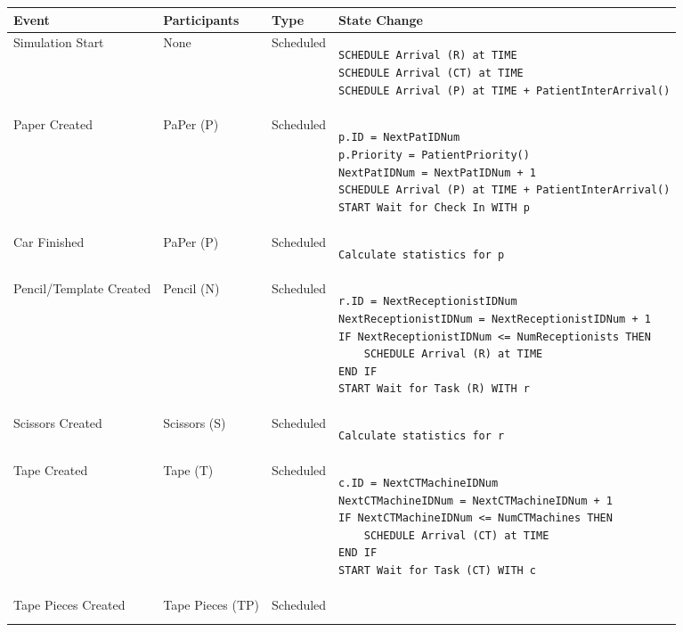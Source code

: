 \begin{longtable}{@{}>{\raggedright\arraybackslash}p{1.5cm}>{\raggedright\arraybackslash}p{2.1cm}>{\raggedright\arraybackslash}p{2.2cm}>{\raggedright\arraybackslash}p{10cm}@{}}
  \toprule
  Event          & Participants & Type       & State Change \\ \midrule
  \endhead
  Simulation Start & None  & Scheduled  & 
  \begin{lstlisting}[language=CMPseudo]
SCHEDULE Arrival (R) at TIME
SCHEDULE Arrival (CT) at TIME
SCHEDULE Arrival (P) at TIME + PatientInterArrival()
  \end{lstlisting}
  \\ \midrule
  Paper Created & PaPer (P)  & Scheduled  & 
  \begin{lstlisting}[language=CMPseudo]
p.ID = NextPatIDNum
p.Priority = PatientPriority()
NextPatIDNum = NextPatIDNum + 1
SCHEDULE Arrival (P) at TIME + PatientInterArrival()
START Wait for Check In WITH p
  \end{lstlisting}
  \\ \midrule
  Car Finished & PaPer (P)  & Scheduled  & 
  \begin{lstlisting}[language=CMPseudo]
Calculate statistics for p
  \end{lstlisting}
  \\ \midrule
  Pencil/Template Created & Pencil (N)  & Scheduled  & 
  \begin{lstlisting}[language=CMPseudo]
r.ID = NextReceptionistIDNum
NextReceptionistIDNum = NextReceptionistIDNum + 1
IF NextReceptionistIDNum <= NumReceptionists THEN
    SCHEDULE Arrival (R) at TIME
END IF
START Wait for Task (R) WITH r
  \end{lstlisting}
  \\ \midrule
  Scissors Created & Scissors (S)  & Scheduled  & 
  \begin{lstlisting}[language=CMPseudo]
Calculate statistics for r
  \end{lstlisting}
  \\ \midrule
  Tape Created & Tape (T)  & Scheduled  & 
  \begin{lstlisting}[language=CMPseudo]
c.ID = NextCTMachineIDNum
NextCTMachineIDNum = NextCTMachineIDNum + 1
IF NextCTMachineIDNum <= NumCTMachines THEN
    SCHEDULE Arrival (CT) at TIME
END IF
START Wait for Task (CT) WITH c
  \end{lstlisting}
  \\ \midrule
  Tape Pieces Created & Tape Pieces (TP)  & Scheduled  & 
  \begin{lstlisting}[language=CMPseudo]

\end{lstlisting}
\end{longtable}
